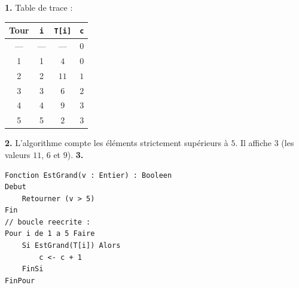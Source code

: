 \documentclass[11pt]{article}
\begin{document}
\begin{corrige}
\textbf{1.} Table de trace :
\begin{center}
\begin{tabular}{|c|c|c|c|}
\hline
\rowcolor{popblueL} Tour & \texttt{i} & \texttt{T[i]} & \texttt{c} \\
\hline
--- & --- & --- & $0$ \\
\hline
1 & 1 & $4$ & $0$ \\
\hline
2 & 2 & $11$ & $1$ \\
\hline
3 & 3 & $6$ & $2$ \\
\hline
4 & 4 & $9$ & $3$ \\
\hline
5 & 5 & $2$ & $3$ \\
\hline
\end{tabular}
\end{center}
\textbf{2.} L'algorithme compte les éléments strictement supérieurs à $5$. Il affiche $3$ (les valeurs $11$, $6$ et $9$).
\textbf{3.}
\begin{lstlisting}
Fonction EstGrand(v : Entier) : Booleen
Debut
    Retourner (v > 5)
Fin
// boucle reecrite :
Pour i de 1 a 5 Faire
    Si EstGrand(T[i]) Alors
        c <- c + 1
    FinSi
FinPour
\end{lstlisting}
\end{corrige}
\end{document}
